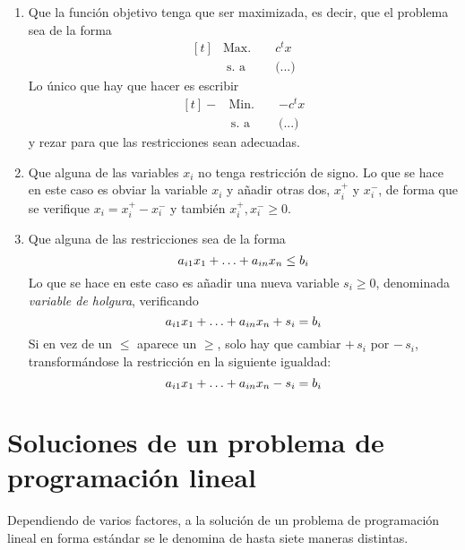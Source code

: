 \documentclass[11pt]{report}
\theoremstyle{mytheorem}
\theoremstyle{mydefinition}
\theoremstyle{myexample}
\begin{document}
\begin{enumerate}
    \item Que la función objetivo tenga que ser maximizada, es decir, que el problema sea de la forma
    \[
\begin{aligned}[t]
&\text{Max. } &&c^tx \\
& \; \text{s. a} &&\textit{(...)}
\end{aligned}
\]
Lo único que hay que hacer es escribir
\[
\begin{aligned}[t]
-&\text{Min. } &&-c^tx \\
& \, \text{s. a} &&\textit{(...)}
\end{aligned}
\]
y rezar para que las restricciones sean adecuadas.
    \item Que alguna de las variables $x_i$ no tenga restricción de signo. Lo que se hace en este caso es obviar la variable $x_i$ y añadir otras dos, $x_i^+$ y $x_i^-$, de forma que se verifique $x_i = x_i^+ - x_i^-$ y también $x_i^+,x_i^- \geq 0$.
    
    \item Que alguna de las restricciones sea de la forma
    \[a_{i1}x_1+\mathellipsis+a_{in}x_n \leq b_i\]
    Lo que se hace en este caso es añadir una nueva variable $s_i \geq 0$, denominada {\textit{variable de holgura}}, verificando
    \[a_{i1}x_1+\mathellipsis+a_{in}x_n +s_i = b_i\]
    Si en vez de un $\leq$ aparece un $\geq$, solo hay que cambiar $+ \, s_i$ por $-\, s_i$, transformándose la restricción en la siguiente igualdad:
    \[a_{i1}x_1+\mathellipsis+a_{in}x_n -s_i = b_i\]
\end{enumerate}

\section{Soluciones de un problema de programación lineal}

Dependiendo de varios factores, a la solución de un problema de programación lineal en forma estándar se le denomina de hasta siete maneras distintas.
\end{document}
